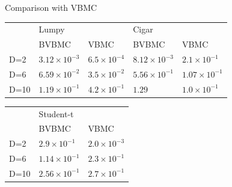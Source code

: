 \documentclass{beamer}
\begin{document}
\begin{frame}
\begin{block}{Comparison with VBMC}
\begin{table}[]
\begin{tabular}{l|l|l|l|l|}
	\cline{2-5}
	& \multicolumn{2}{l|}{Lumpy} & \multicolumn{2}{l|}{Cigar} \\ \cline{2-5} 
	& BVBMC         & VBMC        & BVBMC         & VBMC 
	\\ 
	\hline
	\multicolumn{1}{|l|}{D=2}  & $3.12 \times 10^{-3}$        & $6.5 \times 10^{-4}$         & $8.12 \times 10^{-3}$           & $2.1 \times 10^{-1}$          \\ 
	\hline
	\multicolumn{1}{|l|}{D=6}  & $6.59 \times 10^{-2}$         & $ 3.5 \times 10^{-2}$         & $5.56 \times 10^{-1}$           & $ 1.07 \times 10^{-1}$        \\ \hline
	\multicolumn{1}{|l|}{D=10} & $1.19 \times 10^{-1}$           & $ 4.2 \times 10^{-1}$         & $1.29 $           &  $ 1.0 \times 10^{-1}$        \\ \hline
\end{tabular}

\begin{tabular}{l|l|l|}
	\cline{2-3}
	& \multicolumn{2}{l|}{Student-t} \\ \cline{2-3} 
	& BVBMC         & VBMC         \\ \hline
	\multicolumn{1}{|l|}{D=2} & $2.9 \times 10^{-1}$          & $2.0 \times 10^{-3}$         \\ \hline
	\multicolumn{1}{|l|}{D=6}     & $1.14 \times 10^{-1}$           & $2.3 \times 10^{-1}$         \\ \hline
	\multicolumn{1}{|l|}{D=10} & $2.56 \times 10^{-1}$           & $ 2.7 \times 10^{-1}$        \\ \hline
\end{tabular}

\end{table}
\end{block}
\end{frame}
\end{document}
